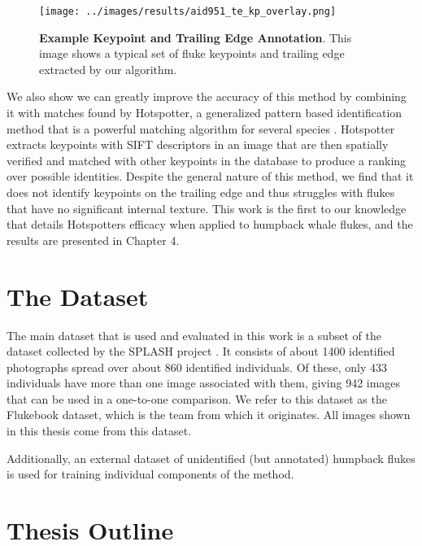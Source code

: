 \begin{figure}[t]%
\centering
\texttt{[image: ../images/results/aid951\_te\_kp\_overlay.png]}
\caption{\textbf{Example Keypoint and Trailing Edge Annotation}. This image shows a typical set of fluke keypoints and trailing edge extracted by our algorithm.}
\label{fig:example_overlay}
\end{figure}

We also show we can greatly improve the accuracy of this method by combining it with matches found by Hotspotter, a generalized pattern based identification method that is a powerful matching algorithm for several species \cite{crall_hotspotter_2013}.
Hotspotter extracts keypoints with SIFT descriptors in an image that are then spatially verified and matched with other keypoints in the database to produce a ranking over possible identities. 
Despite the general nature of this method, we find that it does not identify keypoints on the trailing edge and thus struggles with flukes that have no significant internal texture. 
This work is the first to our knowledge that details Hotspotters efficacy when applied to humpback whale flukes, and the results are presented in Chapter 4.

\section{The Dataset}

The main dataset that is used and evaluated in this work is a subset of the dataset collected by the SPLASH project \cite{calambokidis2008splash}. 
It consists of about 1400 identified photographs spread over about 860 identified individuals.
Of these, only 433 individuals have more than one image associated with them, giving 942 images that can be used in a one-to-one comparison.
We refer to this dataset as the Flukebook dataset, which is the team from which it originates.
All images shown in this thesis come from this dataset.

Additionally, an external dataset of unidentified (but annotated) humpback flukes is used for training individual components of the method.


\section{Thesis Outline}


